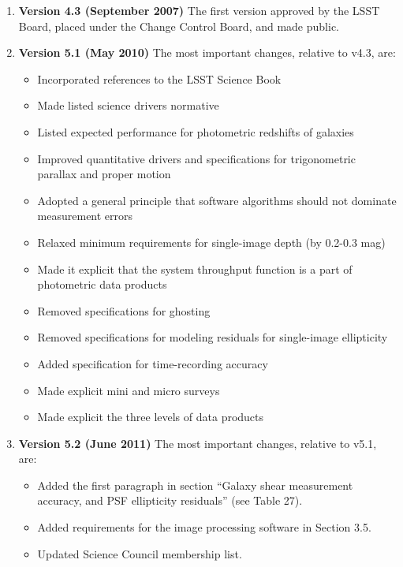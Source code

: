 \begin{enumerate}
\item {\bf Version 4.3 (September 2007)} The first version approved by the LSST Board, placed under the Change
 Control Board, and made public.

\item {\bf Version 5.1 (May 2010)} The most important changes, relative to v4.3, are:
\begin{itemize}
\item Incorporated references to the LSST Science Book
\item Made listed science drivers normative
\item Listed expected performance for photometric redshifts of galaxies
\item Improved quantitative drivers and specifications for trigonometric parallax and proper motion
\item Adopted a general principle that software algorithms should not dominate measurement errors
\item Relaxed minimum requirements for single-image depth (by 0.2-0.3 mag)
\item Made it explicit that the system throughput function is a part of photometric data products
\item Removed specifications for ghosting
\item Removed specifications for modeling residuals for single-image ellipticity
\item Added specification for time-recording accuracy
\item Made explicit mini and micro surveys
\item Made explicit the three levels of data products
\end{itemize}

\item {\bf Version 5.2 (June 2011)} The most important changes, relative to v5.1, are:
\begin{itemize}
\item Added the first paragraph in section ``Galaxy shear measurement accuracy, and PSF ellipticity residuals''
          (see Table 27).
\item Added requirements for the image processing software in Section 3.5.
\item Updated Science Council membership list.
\end{itemize}

\end{enumerate}
